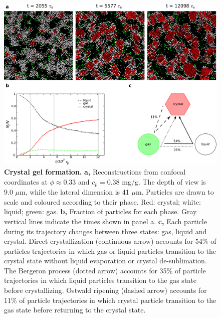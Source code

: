 \documentclass[preprint,amsmath,amssymb,superscriptaddress]{revtex4-1}
\begin{document}
\begin{figure}[!t]
 \centering
 \includegraphics[width=14cm]{fig4}
 \caption{{\bf Crystal gel formation.}  
{\bf a,} Reconstructions from confocal coordinates at $\phi\approx 0.33$ and $c_p=0.38$ mg/g. The depth of view is 9.0 $\mu$m, while the lateral dimension is 41 $\mu$m. Particles are drawn to scale and coloured according to their phase. Red: crystal; white: liquid; green: gas.
{\bf b,} Fraction of particles for each phase. Gray vertical lines indicate the times shown in panel a. 
{\bf c,} Each particle during its trajectory changes between three states: gas, liquid and crystal. Direct crystallization (continuous arrow) accounts for 54\% of particles trajectories in which
gas or liquid particles transition to the crystal state without liquid evaporation or crystal de-sublimation. The Bergeron process (dotted arrow) accounts for 35\% of particle trajectories in which liquid particles
transition to the gas state before crystallizing. Ostwald ripening (dashed arrow) accounts for 11\% of particle trajectories in which crystal particle transition to the gas state before returning
to the crystal state.}
\label{fig:transitions}
\end{figure}
\end{document}
